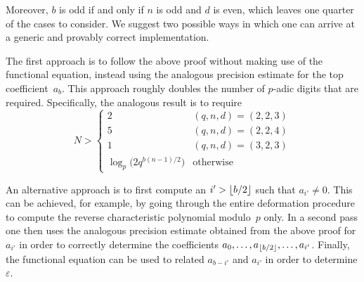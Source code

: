 \begin{rem}
Moreover, $b$ is odd if and only if $n$ is odd and $d$ is even, which leaves 
one quarter of the cases to consider.  We suggest two possible ways in which 
one can arrive at a generic and provably correct implementation.

The first approach is to follow the above proof without making use of the 
functional equation, instead using the analogous precision estimate for the 
top coefficient~$a_b$.  This approach roughly doubles the number of $p$-adic 
digits that are required.  Specifically, the analogous result is to require 
\begin{equation*}
N > \begin{cases}
    2 & (q,n,d) = (2,2,3) \\
    5 & (q,n,d) = (2,2,4) \\
    1 & (q,n,d) = (3,2,3) \\
    \log_p \bigl( 2 q^{b (n-1) / 2} \bigr) & \text{otherwise}
    \end{cases}
\end{equation*}

An alternative approach is to first compute an $i' > \lfloor b/2\rfloor$ such 
that \mbox{$a_{i'} \neq 0$}.  This can be achieved, for example, by going 
through the entire deformation procedure to compute the reverse characteristic 
polynomial modulo~$p$ only.  In a second pass one then uses the analogous 
precision estimate obtained from the above proof for $a_{i'}$ in order to 
correctly determine the coefficients 
$a_0, \dotsc, a_{\left\lfloor b/2\right\rfloor}, \dotsc, a_{i'}$.  Finally, the functional 
equation can be used to related $a_{b-i'}$ and $a_{i'}$ in order to determine 
$\varepsilon$.
\end{rem}


